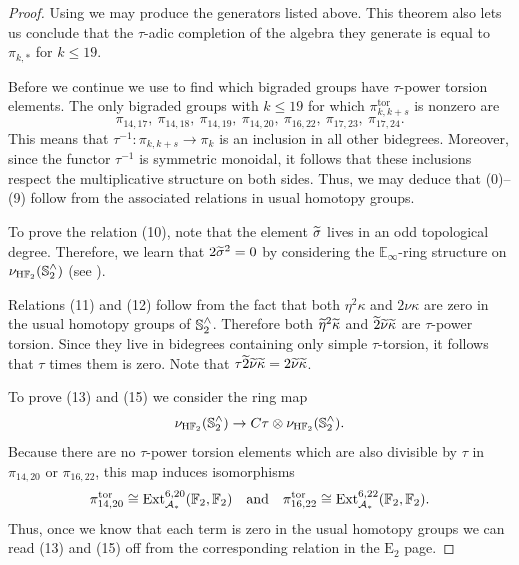 \begin{proof}
  Using  we may produce the generators listed above.
  This theorem also lets us conclude that the $\tau$-adic completion of the algebra they generate is equal to $\pi_{k,*}$ for $k \leq 19$.

  Before we continue we use  to find which bigraded groups have $\tau$-power torsion elements. The only bigraded groups with $k \leq 19$ for which $\pi_{k,k+s}^{\mathrm{tor}}$ is nonzero are
  $$ \pi_{14,17},\ \pi_{14,18},\ \pi_{14,19},\ \pi_{14,20},\ \pi_{16,22},\ \pi_{17,23},\ \pi_{17,24}. $$
  This means that $\tau^{-1} : \pi_{k,k+s} \to \pi_k$ is an inclusion in all other bidegrees.
  Moreover, since the functor $\tau^{-1}$ is symmetric monoidal, it follows that these inclusions respect the multiplicative structure on both sides. Thus, we may deduce that (0)--(9) follow from the associated relations in usual homotopy groups.

  To prove the relation (10), note that the element $\wt{\sigma}$ lives in an odd topological degree. Therefore, we learn that $2 \wt{\sigma}^2 = 0$ by considering the $\mathbb{E}_\infty$-ring structure on $\nu_{\mathrm{H}\mathbb{F}_2}(\operatorname{\mathbb{S}}_2^\wedge)$ (see \cite[Remark 4.10]{Pstragowski}). 

  Relations (11) and (12) follow from the fact that both $\eta^2\kappa$ and $2\nu\kappa$ are zero in the usual homotopy groups of $\operatorname{\mathbb{S}}_2^{\wedge}$.  Therefore both $\wt{\eta}^2\wt{\kappa}$ and $\wt{2}\wt{\nu}\wt{\kappa}$ are $\tau$-power torsion.  Since they live in bidegrees containing only simple $\tau$-torsion, it follows that $\tau$ times them is zero.  Note that $\tau \wt{2}\wt{\nu}\wt{\kappa}=2 \wt{\nu}\wt{\kappa}$.

  To prove (13) and (15) we consider the ring map
  $$ \nu_{\mathrm{H}\mathbb{F}_2}(\operatorname{\mathbb{S}}^\wedge_2) \to C\tau \otimes \nu_{\mathrm{H}\mathbb{F}_2}(\operatorname{\mathbb{S}}^\wedge_2). $$
  Because there are no $\tau$-power torsion elements which are also divisible by $\tau$ in $\pi_{14,20}$ or $\pi_{16,22}$, this map induces isomorphisms
  $$ \pi_{14,20}^{\mathrm{tor}} \cong \Ext^{6,20}_{\A_*}(\F_2, \F_2)\ \ \text{ and }\ \ \pi_{16,22}^{\mathrm{tor}} \cong \Ext^{6,22}_{\A_*}(\F_2, \F_2). $$
  Thus, once we know that each term is zero in the usual homotopy groups we can read (13) and (15) off from the corresponding relation in the $\mathrm{E}_2$ page.


\end{proof}
